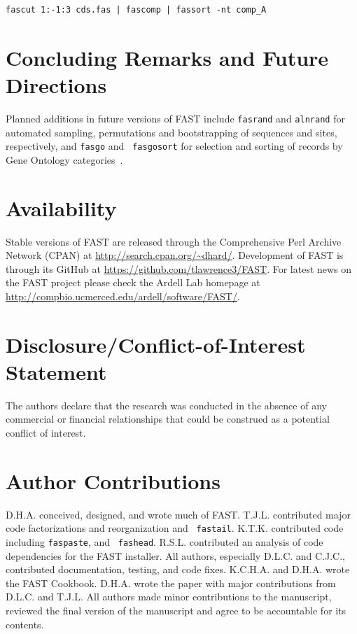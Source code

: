 \documentclass{frontiersSCNS} %
\begin{document}
\begin{verbatim}
fascut 1:-1:3 cds.fas | fascomp | fassort -nt comp_A
\end{verbatim}

\section{Concluding Remarks and Future Directions}

Planned additions in future versions of FAST include {\tt fasrand} and
{\tt alnrand} for automated sampling, permutations and bootstrapping
of sequences and sites, respectively, and {\tt fasgo} and {\tt
  fasgosort} for selection and sorting of records by Gene Ontology
categories~\citep{GO_Consortium28012015}.

\section*{Availability}

Stable versions of FAST are released through the Comprehensive Perl
Archive Network (CPAN) at
\url{http://search.cpan.org/~dhard/}. Development of FAST is through
its GitHub at \url{https://github.com/tlawrence3/FAST}. For latest
news on the FAST project please check the Ardell Lab homepage at
\url{http://compbio.ucmerced.edu/ardell/software/FAST/}.

\section*{Disclosure/Conflict-of-Interest Statement}

The authors declare that the research was conducted in the absence of
any commercial or financial relationships that could be construed as a
potential conflict of interest.

\section*{Author Contributions}

D.H.A. conceived, designed, and wrote much of FAST. T.J.L. contributed
major code factorizations and reorganization and {\tt
  fastail}. K.T.K. contributed code including {\tt faspaste}, and {\tt
  fashead}. R.S.L. contributed an analysis of code dependencies for
the FAST installer. All authors, especially D.L.C. and C.J.C.,
contributed documentation, testing, and code fixes. K.C.H.A. and
D.H.A. wrote the FAST Cookbook. D.H.A. wrote the paper with major
contributions from D.L.C. and T.J.L. All authors made minor
contributions to the manuscript, reviewed the final version of the
manuscript and agree to be accountable for its contents.
\end{document}
